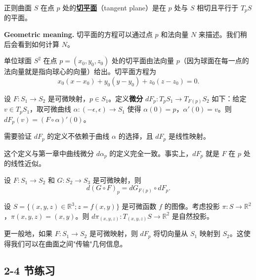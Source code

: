 \begin{Definition}[切平面]\label{def:tangent-plane}
正则曲面 $S$ 在点 $p$ 处的\textbf{\underline{切平面}}（tangent plane）是在 $p$ 处与 $S$ 相切且平行于 $T_pS$ 的平面。
\end{Definition}

\textbf{Geometric meaning.} 切平面的方程可以通过点 $p$ 和法向量 $N$ 来描述。我们稍后会看到如何计算 $N$。

\begin{Example}[球面的切平面]\label{ex:sphere-tangent-plane}
单位球面 $S^2$ 在点 $p = (x_0, y_0, z_0)$ 处的切平面由法向量 $p$（因为球面在每一点的法向量就是指向球心的向量）给出。切平面方程为
\[
x_0(x - x_0) + y_0(y - y_0) + z_0(z - z_0) = 0.
\]
\end{Example}

\begin{Definition}[可微映射的微分]\label{def:differential-map}
设 $F: S_1 \to S_2$ 是可微映射，$p \in S_1$。定义\textbf{微分} $dF_p: T_pS_1 \to T_{F(p)}S_2$ 如下：给定 $v \in T_pS_1$，取可微曲线 $\alpha: (-\epsilon, \epsilon) \to S_1$ 使得 $\alpha(0) = p$，$\alpha'(0) = v$。则 $dF_p(v) = (F \circ \alpha)'(0)$。
\end{Definition}

需要验证 $dF_p$ 的定义不依赖于曲线 $\alpha$ 的选择，且 $dF_p$ 是线性映射。

\begin{Remark}
这个定义与第一章中曲线微分 $d\alpha_p$ 的定义完全一致。事实上，$dF_p$ 就是 $F$ 在 $p$ 处的线性近似。
\end{Remark}

\begin{Proposition}[链式法则]\label{prop:chain-rule-surface}
设 $F: S_1 \to S_2$ 和 $G: S_2 \to S_3$ 是可微映射，则
\[
d(G \circ F)_p = dG_{F(p)} \circ dF_p.
\]
\end{Proposition}

\begin{Example}[投影映射]\label{ex:projection-map}
设 $S = \{(x,y,z) \in \mathbb{R}^3; z = f(x,y)\}$ 是可微函数 $f$ 的图像。考虑投影 $\pi: S \to \mathbb{R}^2$，$\pi(x,y,z) = (x,y)$。则 $d\pi_{(x,y,z)}: T_{(x,y,z)}S \to \mathbb{R}^2$ 是自然投影。

更一般地，如果 $F: S_1 \to S_2$ 是可微映射，则 $dF_p$ 将切向量从 $S_1$ 映射到 $S_2$。这使得我们可以在曲面之间"传输"几何信息。
\end{Example}

\subsection*{2-4 节练习}


